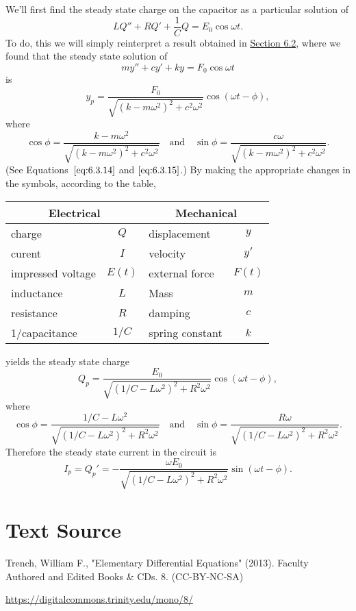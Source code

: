 \documentclass{ximera}
\begin{document}
\begin{example}
\begin{center}
\begin{tikzpicture}[scale=1]
\end{tikzpicture}
\end{center}


\begin{explanation}
We'll first find the steady state charge on the capacitor as
a particular solution of
$$
LQ''+RQ'+\frac{1}{C}Q=E_0\cos\omega t.
$$
To do, this we will simply reinterpret a result obtained in
\href{https://xerxes.ximera.org/differentialequations/main/springProblemsI/springProblemsII}{Section 6.2}, where we found that the steady state solution of
$$
my''+cy'+ky=F_0\cos\omega t
$$
is
$$
y_p=\frac{F_0}{\sqrt{(k-m\omega^2)^2+c^2\omega^2}}
\cos(\omega t-\phi),
$$
where
$$
\cos\phi=\frac{k-m\omega^2}{\sqrt
{(k-m\omega^2)^2+c^2\omega^2}}\quad\mbox{and}\quad
\sin\phi=\frac{c\omega}{\sqrt{(k-m\omega^2)^2+c^2\omega^2}}.
$$
(See Equations~$\eqref{eq:6.3.14}$ and $\eqref{eq:6.3.15}$.) By making the
appropriate changes in the symbols, according to the table,

\begin{center}
\begin{tabular}{|lc|lc|}\hline
\multicolumn{2}{|c|}{\bf Electrical}&
\multicolumn{2}{c|}{\bf Mechanical}\\\hline
charge& $Q$& displacement&$y$\\\hline
curent&$I$&velocity&$y'$\\\hline
impressed voltage&$E(t)$&external force&$F(t)$\\\hline
inductance&$L$&Mass&$m$\\\hline
resistance&$R$&damping&$c$\\\hline
1/capacitance&$1/C$&spring constant&$k$\\\hline
\end{tabular}
\end{center}

yields the steady state charge
$$
Q_p=\frac{E_0}{\sqrt{(1/C-L\omega^2)^2+R^2\omega^2}}\cos(\omega
t-\phi),
$$
where
$$
\cos\phi=\frac{1/C-L\omega^2}{\sqrt{(1/C-L\omega^2)^2+R^2\omega^2}}
\quad\mbox{and}\quad
\sin\phi=\frac{R\omega}{\sqrt{(1/C-L\omega^2)^2+R^2\omega^2}}.
$$
 Therefore the steady state current in the circuit
is
$$
I_p=Q_p'=
-\frac{\omega E_0}{\sqrt{(1/C-L\omega^2)^2+R^2\omega^2}}\sin(\omega
t-\phi).
$$
\end{explanation}
\end{example}
\section*{Text Source}
Trench, William F., "Elementary Differential Equations" (2013). Faculty Authored and Edited Books \& CDs. 8. (CC-BY-NC-SA)

\href{https://digitalcommons.trinity.edu/mono/8/}{https://digitalcommons.trinity.edu/mono/8/}
\end{document}
